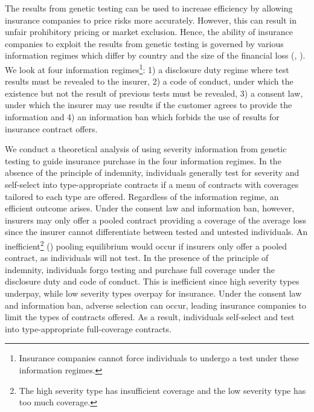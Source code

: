 \documentclass[natbib=false,preprint,12pt]{elsarticle}
\theoremstyle{plain}
\theoremstyle{definition}
\theoremstyle{plain}
\theoremstyle{TheoremNum}
\theoremstyle{CorollaryNum}
\theoremstyle{PropositionNum}
\theoremstyle{TheoremNum}
\begin{document}
The results from genetic testing can be used to increase efficiency by allowing insurance companies to price risks more accurately. However, this can result in unfair prohibitory pricing or market exclusion. Hence, the ability of insurance companies to exploit the results from genetic testing is governed by various information regimes which differ by country and the size of the financial loss (\citeauthor{belisle2019genetic}, \citeyear{belisle2019genetic}). We look at four information regimes\footnote{Insurance companies cannot force individuals to undergo a test under these information regimes.}: 1) a disclosure duty regime where test results must be revealed to the insurer, 2) a code of conduct, under which the existence but not the result of previous tests must be revealed, 3) a consent law, under which the insurer may use results if the customer agrees to provide the information and 4) an information ban which forbids the use of results for insurance contract offers. 

We conduct a theoretical analysis of using severity information from genetic testing to guide insurance purchase in the four information regimes. In the absence of the principle of indemnity, individuals generally test for severity and self-select into type-appropriate contracts if a menu of contracts with coverages tailored to each type are offered. Regardless of the information regime, an efficient outcome arises. Under the consent law and information ban, however, insurers may only offer a pooled contract providing a coverage of the average loss since the insurer cannot differentiate between tested and untested individuals. An inefficient\footnote{The high severity type has insufficient coverage and the low severity type has too much coverage.} \citeauthor{rothschild1978equilibrium} (\citeyear{rothschild1978equilibrium}) pooling equilibrium would occur if insurers only offer a pooled contract, as individuals will not test. In the presence of the principle of indemnity, individuals forgo testing and purchase full coverage under the disclosure duty and code of conduct. This is inefficient since high severity types underpay, while low severity types overpay for insurance. Under the consent law and information ban, adverse selection can occur, leading insurance companies to limit the types of contracts offered. As a result, individuals self-select and test into type-appropriate full-coverage contracts. 
\end{document}
